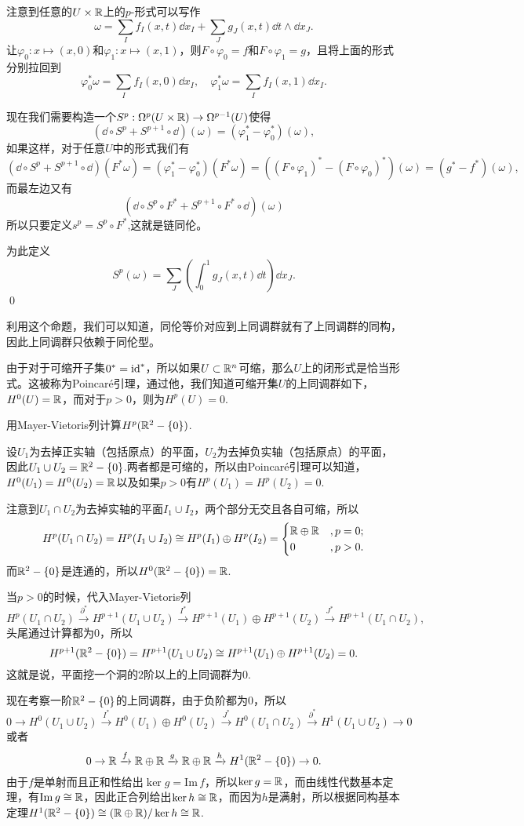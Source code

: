 注意到任意的$U\times \mathbb{R}$上的$p$-形式可以写作
\[
\omega=\sum_If_I(x,t)\dd x_I+\sum_J g_J(x,t)\dd t\wedge \dd x_J.
\]
让$\varphi_0:x\mapsto (x,0)$和$\varphi_1:x\mapsto (x,1)$，则$F\circ \varphi_0=f$和$F\circ \varphi_1=g$，且将上面的形式分别拉回到
\[
\varphi_0^*\omega=\sum_I f_I(x,0)\dd x_I,\quad
\varphi_1^*\omega=\sum_I f_I(x,1)\dd x_I.
\]

现在我们需要构造一个$S^p:\Omega^p(U\times \mathbb{R})\to \Omega^{p-1}(U)$使得
\[
(\dd \circ S^p+S^{p+1}\circ \dd)(\omega)=(\varphi_1^*-\varphi_0^*)(\omega),
\]
如果这样，对于任意$U$中的形式我们有
\[
(\dd \circ S^p+S^{p+1}\circ \dd)(F^*\omega)=(\varphi_1^*-\varphi_0^*)(F^*\omega)=((F\circ \varphi_1)^*-(F\circ \varphi_0)^*)(\omega)=(g^*-f^*)(\omega),
\]
而最左边又有
\[
(\dd \circ S^p\circ F^*+S^{p+1}\circ F^* \circ \dd)(\omega)
\]
所以只要定义$s^p=S^p\circ F^*$,这就是链同伦。

为此定义
\[
S^p(\omega)=\sum_J\left(\int_0^1g_J(x,t)\dd t\right)\dd x_J.
\]\qed

利用这个命题，我们可以知道，同伦等价对应到上同调群就有了上同调群的同构，因此上同调群只依赖于同伦型。

\para 由于对于可缩开子集$0^*=\operatorname{id}^*$，所以如果$U\subset \mathbb{R}^n$可缩，那么$U$上的闭形式是恰当形式。这被称为Poincar\'{e}引理，通过他，我们知道可缩开集$U$的上同调群如下，$H^0(U)=\mathbb{R}$，而对于$p>0$，则为$H^p(U)=0$.

\para 用Mayer-Vietoris列计算$H^{p}(\mathbb{R}^2-\{0\})$.

设$U_1$为去掉正实轴（包括原点）的平面，$U_2$为去掉负实轴（包括原点）的平面，因此$U_1\cup U_2=\mathbb{R}^2-\{0\}$.两者都是可缩的，所以由Poincar\'{e}引理可以知道，$H^0(U_1)=H^0(U_2)=\mathbb{R}$以及如果$p>0$有$H^p(U_1)=H^p(U_2)=0$.

注意到$U_1\cap U_2$为去掉实轴的平面$I_1\cup I_2$，两个部分无交且各自可缩，所以
\[
H^p(U_1\cap U_2)=H^p(I_1\cup I_2) \cong H^p(I_1)\oplus H^p(I_2) =\begin{cases}
\mathbb{R}\oplus\mathbb{R}&,p=0;\\
0&,p>0.
\end{cases}
\]
而$\mathbb{R}^2-\{0\}$是连通的，所以$H^0(\mathbb{R}^2-\{0\})=\mathbb{R}$.

当$p>0$的时候，代入Mayer-Vietoris列
\[
H^p(U_1\cap U_2)\xrightarrow{\partial^*}H^{p+1}(U_1\cup U_2)\xrightarrow{I^*}H^{p+1}(U_1)\oplus H^{p+1}(U_2)\xrightarrow{J^*}H^{p+1}(U_1\cap U_2),
\]
头尾通过计算都为$0$，所以
\[
H^{p+1}(\mathbb{R}^2-\{0\})=H^{p+1}(U_1\cup U_2)\cong H^{p+1}(U_1)\oplus H^{p+1}(U_2)=0.
\]
这就是说，平面挖一个洞的$2$阶以上的上同调群为$0$.

现在考察一阶$\mathbb{R}^2-\{0\}$的上同调群，由于负阶都为$0$，所以
 \[
0\to H^0(U_1\cup U_2)\xrightarrow{I^*}H^0(U_1)\oplus H^0(U_2)\xrightarrow{J^*}H^0(U_1\cap U_2)\xrightarrow{\partial^*}H^{1}(U_1\cup U_2)\to 0
\]
或者
 \[
0\to \mathbb{R}\xrightarrow{f}\mathbb{R}\oplus\mathbb{R}\xrightarrow{g}\mathbb{R}\oplus\mathbb{R}\xrightarrow{h}H^{1}(\mathbb{R}^2-\{0\})\to 0.
\]
由于$f$是单射而且正和性给出$\ker g = \mathrm{Im}\,f$，所以$\ker g =\mathbb{R}$，而由线性代数基本定理，有$\mathrm{Im}\,g \cong \mathbb{R}$，因此正合列给出$\ker h \cong \mathbb{R}$，而因为$h$是满射，所以根据同构基本定理$H^{1}(\mathbb{R}^2-\{0\})\cong(\mathbb{R}\oplus\mathbb{R})/\ker h \cong \mathbb{R}$.

